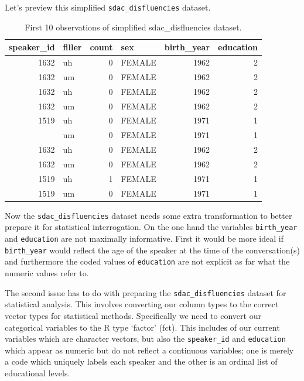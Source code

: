 \documentclass[
  letterpaper,
]{latex/krantz}
\begin{document}
Let's preview this simplified \texttt{sdac\_disfluencies} dataset.

\hypertarget{tbl-i-sdac-disfluencies-preview}{}
\begin{table}
\caption{\label{tbl-i-sdac-disfluencies-preview}First 10 observations of simplified sdac\_disfluencies dataset. }\tabularnewline

\centering
\begin{tabular}{rlrlrr}
\toprule
speaker\_id & filler & count & sex & birth\_year & education\\
\midrule
1632 & uh & 0 & FEMALE & 1962 & 2\\
1632 & um & 0 & FEMALE & 1962 & 2\\
1632 & uh & 0 & FEMALE & 1962 & 2\\
1632 & um & 0 & FEMALE & 1962 & 2\\
1519 & uh & 0 & FEMALE & 1971 & 1\\
\addlinespace
1519 & um & 0 & FEMALE & 1971 & 1\\
1632 & uh & 0 & FEMALE & 1962 & 2\\
1632 & um & 0 & FEMALE & 1962 & 2\\
1519 & uh & 1 & FEMALE & 1971 & 1\\
1519 & um & 0 & FEMALE & 1971 & 1\\
\bottomrule
\end{tabular}
\end{table}

Now the \texttt{sdac\_disfluencies} dataset needs some extra
transformation to better prepare it for statistical interrogation. On
the one hand the variables \texttt{birth\_year} and \texttt{education}
are not maximally informative. First it would be more ideal if
\texttt{birth\_year} would reflect the age of the speaker at the time of
the conversation(s) and furthermore the coded values of
\texttt{education} are not explicit as far what the numeric values refer
to.

The second issue has to do with preparing the
\texttt{sdac\_disfluencies} dataset for statistical analysis. This
involves converting our column types to the correct vector types for
statistical methods. Specifically we need to convert our categorical
variables to the R type `factor' (fct). This includes of our current
variables which are character vectors, but also the \texttt{speaker\_id}
and \texttt{education} which appear as numeric but do not reflect a
continuous variables; one is merely a code which uniquely labels each
speaker and the other is an ordinal list of educational levels.
\end{document}
